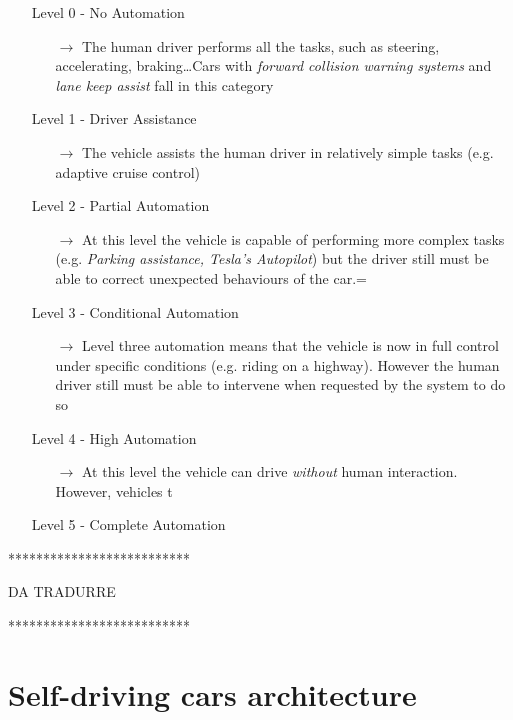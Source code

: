 \begin{itemize}
	\item[Level 0 - ] No Automation
	\begin{itemize}
		\item[$\rightarrow$ ] The human driver performs all the tasks, such as steering, accelerating, braking\dots Cars with \textsl{forward collision warning systems} and \textsl{lane keep assist} fall in this category
	\end{itemize}
	\item[Level 1 - ] Driver Assistance
	\begin{itemize}
		\item[$\rightarrow$ ] The vehicle assists the human driver in relatively simple tasks (e.g. adaptive cruise control)
	\end{itemize}
	\item[Level 2 - ] Partial Automation
	\begin{itemize}
		\item[$\rightarrow$ ] At this level the vehicle is capable of performing more complex tasks (e.g. \textsl{Parking assistance, Tesla's Autopilot}) but the driver still must be able to correct unexpected behaviours of the car.=
	\end{itemize}
	\item[Level 3 - ] Conditional Automation
	\begin{itemize}
		\item[$\rightarrow$ ] Level three automation means that the vehicle is now in full control under specific conditions (e.g. riding on a highway). However the human driver still must be able to intervene when requested by the system to do so
	\end{itemize}
	\item[Level 4 - ] High Automation
	\begin{itemize}
		\item[$\rightarrow$ ] At this level the vehicle can drive \textsl{without} human interaction. However, vehicles t
	\end{itemize}
	\item[Level 5 - ] Complete Automation
\end{itemize}



**************************

DA TRADURRE

**************************

\section{Self-driving cars architecture}

